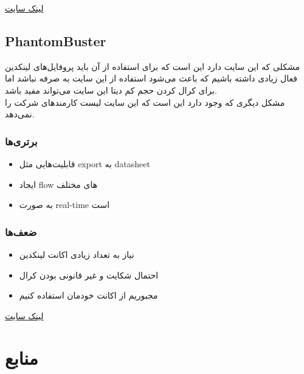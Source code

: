 \href{https://www.peopledatalabs.com/}{لینک سایت}



\subsection{PhantomBuster}

مشکلی که این سایت دارد این است که برای استفاده از آن باید پروفایل‌های لینکدین فعال زیادی داشته باشیم که باعث می‌شود استفاده از این سایت به صرفه نباشد اما برای کرال کردن حجم کم دیتا این سایت می‌تواند مفید باشد.\\
مشکل دیگری که وجود دارد این است که این سایت لیست کارمند‌های شرکت را نمی‌دهد.

\subsubsection{برتری‌ها}
\begin{itemize}
    \item قابلیت‌هایی مثل export به datasheet
    \item ایجاد flow های مختلف
    \item به صورت real-time است
\end{itemize}
\subsubsection{ضعف‌ها}
\begin{itemize}
    \item نیاز به تعداد زیادی اکانت لینکدین
    \item احتمال شکایت و غیر قانونی بودن کرال
    \item مجبوریم از اکانت خودمان استفاده کنیم
\end{itemize}

\href{https://phantombuster.com/}{لینک سایت}


\section{منابع}


